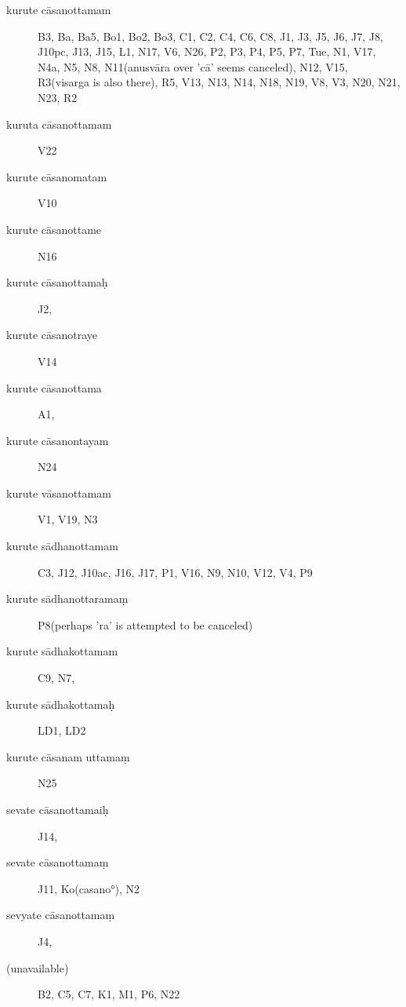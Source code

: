 \begin{ekdosis}
  
  \begin{marma}[hp01_052]
    \begin{description}
    \item[kurute cāsanottamam] B3, Ba, Ba5, Bo1, Bo2, Bo3, C1, C2, C4, C6, C8, J1, J3, J5, J6, J7, J8, J10pc, J13, J15, L1, N17, V6, N26, P2, P3, P4, P5, P7, Tue, N1, V17, N4a, N5, N8, N11(anusvāra over 'cā' seems canceled), N12, V15, R3(visarga is also there), R5, V13, N13, N14, N18, N19, V8, V3, N20, N21, N23, R2
    \item[kuruta cāsanottamam]        V22
    \item[kurute cāsanomatam]        V10
    \item[kurute cāsanottame]        N16
    \item[kurute cāsanottamaḥ]        J2,
    \item[kurute cāsanotraye]        V14
    \item[kurute cāsanottama]        A1,
    \item[kurute cāsanontayam]   N24
    \item[kurute vāsanottamam]        V1, V19, N3
    \item[kurute sādhanottamam]        C3, J12, J10ac, J16, J17, P1, V16, N9, N10, V12, V4, P9
    \item[kurute sādhanottaramaṃ]        P8(perhaps 'ra' is attempted to be canceled)
    \item[kurute sādhakottamam]        C9, N7,
    \item[kurute sādhakottamaḥ]        LD1, LD2
    \item[kurute cāsanam uttamaṃ]         N25
    \item[sevate cāsanottamaiḥ]        J14,
    \item[sevate cāsanottamaṃ]        J11, Ko(casano°), N2
    \item[sevyate cāsanottamaṃ]        J4,
    \item[(unavailable)]        B2, C5, C7, K1, M1, P6, N22
    \end{description}
  \end{marma}



\end{ekdosis}
